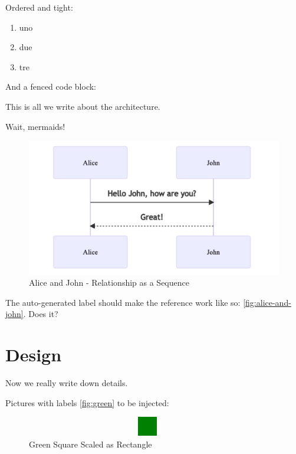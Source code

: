 Ordered and tight:

\begin{enumerate}
\def\labelenumi{\arabic{enumi}.}
\tightlist
\item
  uno
\item
  due
\item
  tre
\end{enumerate}

And a fenced code block:

\begin{Shaded}
\begin{Highlighting}[]
\OperatorTok{()\{\}}
\end{Highlighting}
\end{Shaded}

This is all we write about the architecture.

Wait, mermaids!

\begin{figure}
\centering
\includegraphics{images/alice-and-john.png}
\caption{Alice and John - Relationship as a Sequence}
\end{figure}

The auto-generated label should make the reference work like so:
\ref{fig:alice-and-john}. Does it?

\hypertarget{design}{%
\section{Design}\label{design}}

Now we really write down details.

Pictures with labels \ref{fig:green} to be injected:

\begin{figure}
\centering
\includegraphics[width=0.95\textwidth,height=0.33333in]{images/green.png}
\caption{Green Square Scaled as Rectangle}
\end{figure}

